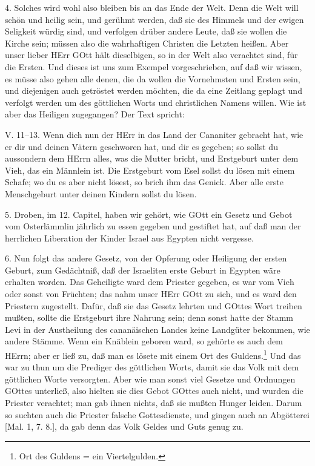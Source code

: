 4. Solches wird wohl also bleiben bis an das Ende der Welt. Denn die Welt will schön und heilig sein, und gerühmt werden, daß sie des Himmels und der ewigen Seligkeit würdig sind, und verfolgen drüber andere Leute, daß sie wollen die Kirche sein; müssen also die wahrhaftigen Christen die Letzten heißen. Aber unser lieber HErr GOtt hält dieselbigen, so in der Welt also verachtet sind, für die Ersten. Und dieses ist uns zum Exempel vorgeschrieben, auf daß wir wissen, es müsse also gehen alle denen, die da wollen die Vornehmsten und Ersten sein, und diejenigen auch getröstet werden möchten, die da eine Zeitlang geplagt und verfolgt werden um des göttlichen Worts und christlichen Namens willen. Wie ist aber das Heiligen zugegangen? Der Text spricht:

\begin{schriftzitat}
V. 11–13. Wenn dich nun der HErr in das Land der Cananiter gebracht hat, wie er dir und deinen Vätern geschworen hat, und dir es gegeben; so sollst du aussondern dem HErrn alles, was die Mutter bricht, und Erstgeburt unter dem Vieh, das ein Männlein ist. Die Erstgeburt vom Esel sollst du lösen mit einem Schafe; wo du es aber nicht lösest, so brich ihm das Genick. Aber alle erste Menschgeburt unter deinen Kindern sollst du lösen.
\end{schriftzitat}

5. Droben, im 12. Capitel, haben wir gehört, wie GOtt ein Gesetz und Gebot vom Osterlämmlin jährlich zu essen gegeben und gestiftet hat, auf daß man der herrlichen Liberation der Kinder Israel aus Egypten nicht vergesse.

6. Nun folgt das andere Gesetz, von der Opferung oder Heiligung der ersten Geburt, zum Gedächtniß, daß der Israeliten erste Geburt in Egypten wäre erhalten worden. Das Geheiligte ward dem Priester gegeben, es war vom Vieh oder sonst von Früchten; das nahm unser HErr GOtt zu sich, und es ward den Priestern zugestellt. Dafür, daß sie das Gesetz lehrten und GOttes Wort treiben mußten, sollte die Erstgeburt ihre Nahrung sein; denn sonst hatte der Stamm Levi in der Austheilung des cananäischen Landes keine Landgüter bekommen, wie
andere Stämme. Wenn ein Knäblein geboren ward, so gehörte es auch dem HErrn; aber er ließ zu, daß man es lösete mit einem Ort des Guldens.\footnote{Ort des Guldens = ein Viertelgulden.} Und das war zu thun um die Prediger des göttlichen Worts, damit sie das Volk mit dem göttlichen Worte versorgten. Aber wie man sonst viel Gesetze und Ordnungen GOttes unterließ, also hielten sie dies Gebot GOttes auch nicht, und wurden die Priester verachtet; man gab ihnen nichts, daß sie mußten Hunger leiden. Darum so suchten auch die Priester falsche Gottesdienste, und gingen auch an Abgötterei [Mal. 1, 7. 8.], da gab denn das Volk Geldes und Guts genug zu.

